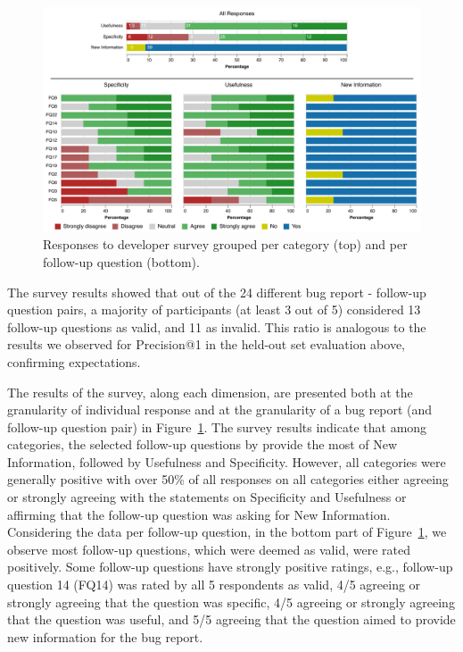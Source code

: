 \begin{figure}[t]
\centering
\includegraphics[width=0.99\linewidth]{figures/viz_group.pdf}
\caption{Responses to developer survey grouped per category (top) and per follow-up question (bottom).}
\label{fig:survey}
\end{figure}

The survey results showed that out of the 24 different bug report - follow-up question pairs, a majority of participants (at least 3 out of 5) considered 13 follow-up questions as valid, and 11 as invalid. This ratio is analogous to the results we observed for Precision@1 in the held-out set evaluation above, confirming expectations.

The results of the survey, along each dimension, are presented both at the granularity of individual response and at the granularity of a bug report (and follow-up question pair) in Figure~\ref{fig:survey}. The survey results indicate that among categories, the selected follow-up questions by \evpi provide the most of New Information, followed by Usefulness and Specificity. However, all categories were generally positive with over 50\% of all responses on all categories either agreeing or strongly agreeing with the statements on Specificity and Usefulness or affirming that the follow-up question was asking for New Information. Considering the data per follow-up question, in the bottom part of Figure~\ref{fig:survey}, we observe most follow-up questions, which were deemed as valid, were rated positively.  Some follow-up questions have strongly positive ratings, e.g., follow-up question 14 (FQ14) was rated by all 5 respondents as valid, 4/5 agreeing or strongly agreeing that the question was specific, 4/5 agreeing or strongly agreeing that the question was useful, and 5/5 agreeing that the question aimed to provide new information for the bug report.


